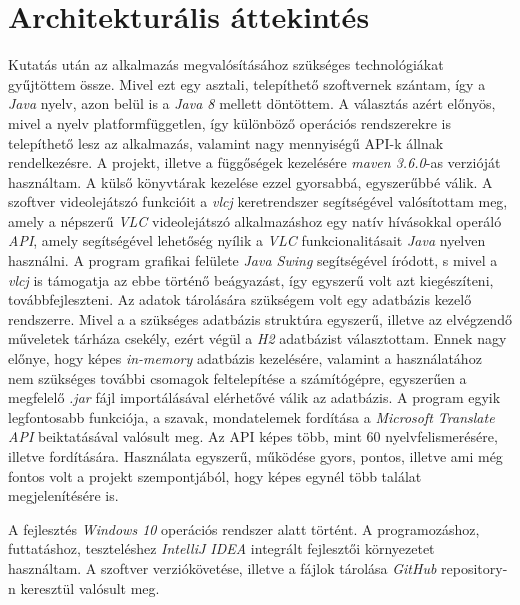 \section{Architekturális áttekintés}

Kutatás után az alkalmazás megvalósításához szükséges technológiákat gyűjtöttem össze. Mivel ezt egy asztali, telepíthető szoftvernek szántam, így a \textit{Java} nyelv, azon belül is a \textit{Java 8} mellett döntöttem. A választás azért előnyös, mivel a nyelv platformfüggetlen, így különböző operációs rendszerekre is telepíthető lesz az alkalmazás, valamint nagy mennyiségű API-k állnak rendelkezésre. A projekt, illetve a függőségek kezelésére \textit{maven 3.6.0}-as verzióját használtam. A külső könyvtárak kezelése ezzel  gyorsabbá, egyszerűbbé válik. A szoftver videolejátszó funkcióit a \textit{vlcj} keretrendszer segítségével valósítottam meg, amely a népszerű \textit{VLC} videolejátszó alkalmazáshoz egy natív hívásokkal operáló \textit{API}, amely segítségével lehetőség nyílik a \textit{VLC} funkcionalitásait \textit{Java} nyelven használni. A program grafikai felülete \textit{Java Swing} segítségével íródott, s mivel a \textit{vlcj} is támogatja az ebbe történő beágyazást, így egyszerű volt azt kiegészíteni, továbbfejleszteni. Az adatok tárolására szükségem volt egy adatbázis kezelő rendszerre. Mivel a a szükséges adatbázis struktúra egyszerű, illetve az elvégzendő műveletek tárháza csekély, ezért végül a \textit{H2} adatbázist választottam. Ennek nagy előnye, hogy képes \textit{in-memory} adatbázis kezelésére, valamint a használatához nem szükséges további csomagok feltelepítése a számítógépre, egyszerűen a megfelelő \textit{.jar} fájl importálásával elérhetővé válik az adatbázis. A program egyik legfontosabb funkciója, a szavak, mondatelemek fordítása a \textit{Microsoft Translate API} beiktatásával valósult meg. Az API képes több, mint 60 nyelvfelismerésére, illetve fordítására. Használata egyszerű, működése gyors, pontos, illetve ami még fontos volt a projekt szempontjából, hogy képes egynél több találat megjelenítésére is.

A fejlesztés \textit{Windows 10} operációs rendszer alatt történt. A programozáshoz, futtatáshoz, teszteléshez \textit{IntelliJ IDEA} integrált fejlesztői környezetet használtam. A szoftver verziókövetése, illetve a fájlok tárolása \textit{GitHub} repository-n keresztül valósult meg.